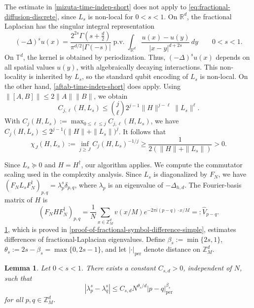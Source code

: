\documentclass[10pt,reqno]{article}
\numberwithin{equation}{section}
\theoremstyle{plain}
\newtheorem{lem}[thm]{Lemma}
\theoremstyle{definition}
\begin{document}
The estimate in \cref{mizuta-time-indep-short} does not apply to \cref{eq:fractional-diffusion-discrete}, since \(L_s\) is non-local for \(0<s<1\). On \(\mathbb R^d\), the fractional Laplacian has the singular integral representation
\begin{equation}\label{eq:frac-lap-singular-integral}
(-\Delta)^s u(x) = \frac{2^{2s}\Gamma (s+\frac{d}{2})} {\pi^{d/2}|\Gamma (-s)|} \operatorname{p.v.} \int_{\mathbb R^d} \frac{u(x)-u(y)}{|x-y|^{d+2s}}\,dy \qquad 0<s<1.
\end{equation}
On \(\mathbb T^d\), the kernel is obtained by periodization. Thus, \((-\Delta)^s u(x)\) depends on all spatial values \(u(y)\), with algebraically decaying interactions. This non-locality is inherited by \(L_s\), so the standard qubit encoding of \(L_s\) is non-local. On the other hand, \cref{aftab-time-indep-short} does apply. Using \(\|[A,B]\|\leq 2\|A\|\|B\|\), we obtain
\begin{equation}\label{eq:fractional-crude-Cjl-bound}
C_{j,\ell}(H,L_s) \leq \binom{j}{\ell} 2^{j-1} \|H\|^{j-\ell} \|L_s\|^\ell .
\end{equation}
With \(C_j(H,L_s):=\max_{0\leq \ell\leq j} C_{j,\ell}(H,L_s)\), we have \(C_j(H,L_s) \leq 2^{j-1}\bigl(\|H\|+\|L_s\|\bigr)^j\). It follows that
\begin{equation}
\chi_J(H,L_s) := \inf_{j\geq J} C_j(H,L_s)^{-1/j} \geq \frac{1}{2(\|H\|+\|L_s\|)} > 0 .
\end{equation}

Since \(L_s\succeq0\) and \(H=H^\dagger\), our algorithm applies. We compute the commutator scaling used in the complexity analysis. Since \(L_s\) is diagonalized by \(F_N\), we have $(F_NL_sF_N^\dagger)_{p,q}=\lambda_p^s\delta_{p,q}$, where \(\lambda_p\) is an eigenvalue of \(-\Delta_{h,d}\). The Fourier-basis matrix of $H$ is
\begin{equation}\label{eq:fractional-FHF}
(F_NHF_N^\dagger)_{p,q}
=
\frac{1}{N}\sum_{x\in\mathbb Z_M^d}v(x/M)e^{-2\pi i(p-q)\cdot x/M}
=: \widehat V_{p-q}.
\end{equation}
\cref{lem:fractional-symbol-difference-simple}, which is proved in \cref{proof-of-fractional-symbol-difference-simple}, estimates differences of fractional-Laplacian eigenvalues. Define \(\beta_s:=\min\{2s,1\}\), \(\theta_s:=2s-\beta_s=\max\{0,2s-1\}\), and let \(|\cdot|_{\operatorname{per}}\) denote distance on \(\mathbb Z_M^d\).

\begin{lem}\label{lem:fractional-symbol-difference-simple}
Let $0 < s < 1$. There exists a constant \(C_{s,d}>0\), independent of \(N\), such that
\begin{equation}\label{eq:fractional-symbol-difference-simple}
|\lambda_p^s-\lambda_q^s| \leq C_{s,d} N^{\theta_s/d} |p-q|_{\operatorname{per}}^{\beta_s}
\end{equation}
for all \(p,q\in \mathbb Z_M^d\).
\end{lem}
\end{document}
